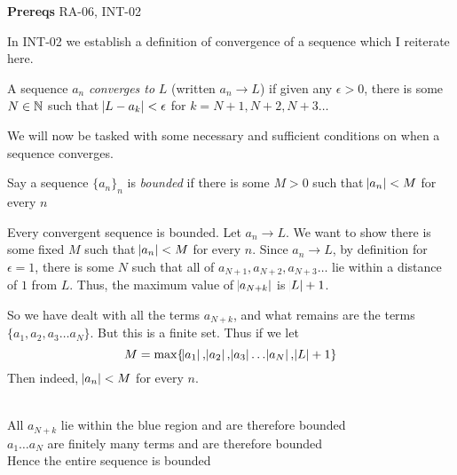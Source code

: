 

\textbf{Prereqs} RA-06, INT-02

In INT-02 we establish a definition of convergence of a sequence which I reiterate here.

\begin{SNP}{\dfn}
{
	A sequence $a_n$ \emph{converges to} $L$ (written $a_n \rightarrow L$) if given any $\epsilon > 0$, there is some $N \in \mathbb{N}$ such that $\abs{L - a_k} < \epsilon$ for $k = N + 1, N + 2, N + 3 \dots$
}

\end{SNP}

We will now be tasked with some necessary and sufficient conditions on when a sequence converges.

\begin{SNP}{\dfn}{
	Say a sequence $\{a_n\}_n$ is \emph{bounded} if there is some $M > 0$ such that $\abs{a_n} < M$ for every $n$
}
\end{SNP}
\begin{SWP}{\thm
}{Every convergent sequence is bounded.
}
Let $a_n \rightarrow L$. We want to show there is some fixed $M$ such that $\abs{a_n} < M$ for every $n$. Since $a_n \rightarrow L$, by definition for $\epsilon = 1$, there is some $N$ such that all of $a_{N + 1}, a_{N + 2}, a_{N + 3} \dots$ lie within a distance of $1$ from $L$. Thus, the maximum value of $\abs{a_{N + k}}$ is $\abs L + 1$.

So we have dealt with all the terms $a_{N + k}$, and what remains are the terms $\{a_1, a_2, a_3 \dots a_N\}$. But this is a finite set. Thus if we let
$$
M = \max \{ \abs{a_1}, \abs{a_2}, \abs{a_3} \dots \abs{a_N}, \abs L + 1 \}
$$
Then indeed, $\abs{a_n} < M$ for every $n$.
\end{SWP}
\begin{smrg}
\begin{center}
\\
All $a_{N + k}$ lie within the blue region and are therefore bounded \\
$a_1 \dots a_N$ are finitely many terms and are therefore bounded \\
Hence the entire sequence is bounded
\end{center}
\end{smrg}
